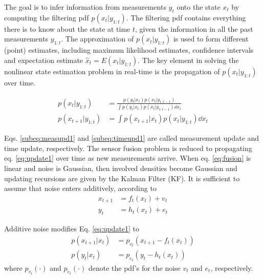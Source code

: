 The goal is to infer information from measurements $ y_{t} $ onto the state $ x_{t} $ by computing the filtering pdf $ p ( x_{t} | y_{1:t} ) $.  The filtering pdf contains everything there is to know about the state at time $ t $, given the information in all the past measurements $ y_{1:t} $. The approximation of $ p ( x_{t} | y_{1:t} ) $ is used to form different (point) estimates, including maximum likelihood estimates, confidence intervals and expectation estimate $ \hat{x}_{t} = E( x_{t} | y_{1:t} ) $. The key element in solving the nonlinear state estimation problem in real-time is the propagation of $ p ( x_{t} | y_{1:t} ) $ over time. 

\begin{subequations}\label{eq:update1} \begin{align}
	p ( x_{t} | y_{1:t} ) &= \frac { p ( y_{t} | x_{t} ) p ( x_{t} | y_{1:t-1} ) } { \int p ( y_{t} | x_{t} ) p ( x_{t} | y_{1:t-1} ) \dd{x_{t}} } \label{subeq:measupd1}\\
	p ( x_{t+1} | y_{1:t} ) &= \int p ( x_{t+1} | x_{t} ) p ( x_{t} | y_{1:t} ) \dd{x_{t}} \label{subeq:timeupd1}
\end{align} \end{subequations}

Eqs. \ref{subeq:measupd1} and \ref{subeq:timeupd1}  are called measurement update and time update, respectively.  The sensor fusion problem is reduced to propagating eq. \ref{eq:update1} over time as new measurements arrive. When eq. \ref{eq:fusion} is linear and noise is Gaussian, then involved densities become Gaussian and updating recursions are given by the Kalman Filter (KF). It is sufficient to assume that noise enters additively, according to
\begin{subequations} \begin{align}
	x_{t+1} &= f_{t} ( x_{t} ) + v_{t} \\
	y_{t} &= h_{t} ( x_{t} ) + e_{t}
\end{align} \end{subequations}

Additive noise modifies Eq. \ref{eq:update1} to
\begin{subequations} \begin{align}
	p ( x_{t+1} | x_{t} ) &= p_{v_{t}} ( x_{t+1} - f_{t} ( x_{t} ) ) \\
	p ( y_{t} | x_{t} ) &= p_{e_{t}} ( y_{t} - h_{t} ( x_{t} ) )
\end{align} \end{subequations}
where $ p_{v_{t}} (\cdot) $ and $ p_{e_{t}} (\cdot) $ denote the pdf's for the noise $ v_{t} $ and $ e_{t} $, respectively.

